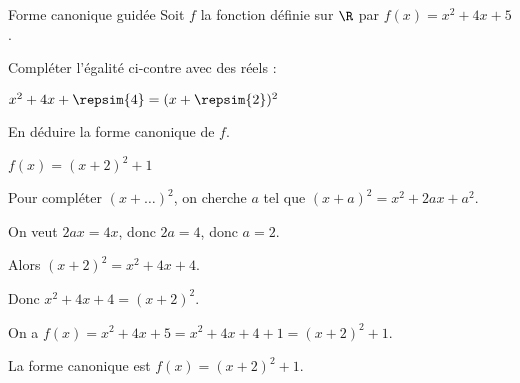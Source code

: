 \begin{EXO}{Forme canonique guidée}{}
Soit $f$ la fonction définie sur $\R$ par $ f(x) = x^2+4x+5$.
\begin{tcbenumerate}[2]
\tcbitem {} Compléter l'égalité ci-contre avec des réels : 
\begin{center}
$x^2+4x+\repsim{4} = (x+\repsim{2})^2$
\end{center}

\tcbitem {} En déduire la forme canonique de $f$.

\begin{crep}
$f(x) = (x+2)^2 + 1$
\end{crep}
\end{tcbenumerate}

\exocorrection

\begin{tcbenumerate}[2]
\tcbitem Pour compléter $(x+\dots)^2$, on cherche $a$ tel que $(x+a)^2 = x^2+2ax+a^2$.

On veut $2ax = 4x$, donc $2a = 4$, donc $a = 2$.

Alors $(x+2)^2 = x^2+4x+4$.

Donc $x^2+4x+4 = (x+2)^2$.

\tcbitem On a $f(x) = x^2+4x+5 = x^2+4x+4+1 = (x+2)^2+1$.

La forme canonique est $f(x) = (x+2)^2 + 1$.
\end{tcbenumerate}
\end{EXO}